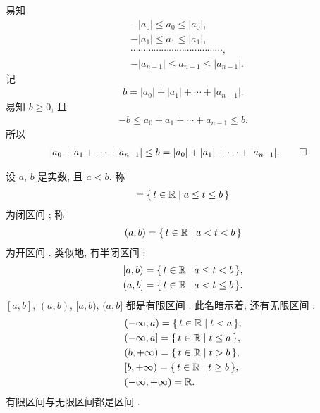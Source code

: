 \begin{pf}
    易知
    \begin{align*}
         & -|a_0| \leq a_0 \leq |a_0|,             \\
         & -|a_1| \leq a_1 \leq |a_1|,             \\
         & \cdots \cdots \cdots \cdots
        \cdots \cdots \cdots \cdots
        \cdots \cdots \cdots \cdots,               \\
         & -|a_{n-1}| \leq a_{n-1} \leq |a_{n-1}|.
    \end{align*}
    记
    \begin{align*}
        b = |a_0| + |a_1| + \cdots + |a_{n-1}|.
    \end{align*}
    易知 $b \geq 0$, 且
    \begin{align*}
        -b \leq a_0 + a_1 + \cdots + a_{n-1} \leq b.
    \end{align*}
    所以
    \begin{align*}
         & |a_0 + a_1 + \cdots + a_{n-1}| \leq b = |a_0| + |a_1| + \cdots + |a_{n-1}|. \qedhere
    \end{align*}
\end{pf}

\begin{definition}
    设 $a$, $b$ 是实数, 且 $a < b$. 称
    \begin{align*}
        [a,b] = \{\, t \in \RR \mid a \leq t \leq b \,\}
    \end{align*}
    为闭区间 ; 称
    \begin{align*}
        (a,b) = \{\, t \in \mathbb{R} \mid a < t < b \,\}
    \end{align*}
    为开区间 . 类似地, 有半闭区间 :
    \begin{align*}
         & [a,b) = \{\, t \in \mathbb{R} \mid a \leq t < b \,\}, \\
         & (a,b] = \{\, t \in \mathbb{R} \mid a < t \leq b \,\}.
    \end{align*}
    $[a,b]$, $(a,b)$, $[a,b)$, $(a,b]$ 都是有限区间 . 此名暗示着, 还有无限区间 :
    \begin{align*}
         & (-\infty, a) = \{\, t \in \mathbb{R} \mid t < a \,\},    \\
         & (-\infty, a] = \{\, t \in \mathbb{R} \mid t \leq a \,\}, \\
         & (b, +\infty) = \{\, t \in \mathbb{R} \mid t > b \,\},    \\
         & [b, +\infty) = \{\, t \in \mathbb{R} \mid t \geq b \,\}, \\
         & (-\infty, +\infty) = \mathbb{R}.
    \end{align*}
    有限区间与无限区间都是区间 .
\end{definition}

